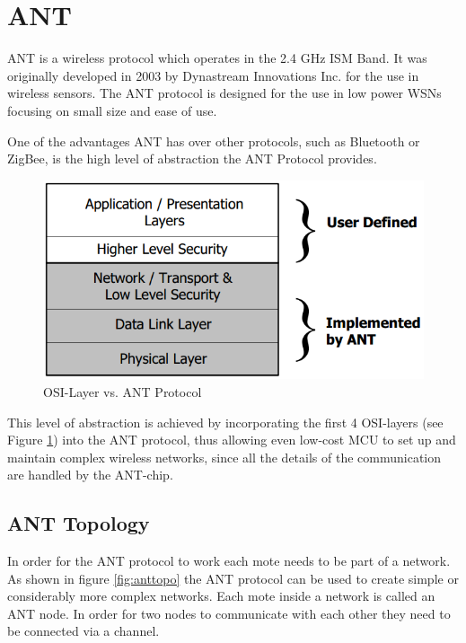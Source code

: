 \section{ANT}
ANT \cite{DynastreamInnovationsInc.2013} is a wireless protocol which operates in the 2.4 GHz ISM Band. It was originally developed in 2003 by Dynastream Innovations Inc. for the use in wireless sensors. The ANT protocol is designed for the use in low power WSNs focusing on small size and ease of use.

One of the advantages ANT has over other protocols, such as Bluetooth or ZigBee, is the high level of abstraction the ANT Protocol provides. 
\begin{figure}[H]
	\centering
	\includegraphics[scale=.5]{content/images/ANTstack.png}
	\caption{OSI-Layer vs. ANT Protocol\cite{Networks}}\label{fig:osilayer}
\end{figure}

This level of abstraction is achieved by incorporating the first 4 OSI-layers (see Figure \ref{fig:osilayer}) into the ANT protocol, thus allowing even low-cost MCU to set up and maintain complex wireless networks, since all the details of the communication are handled by the ANT-chip.

\subsection{ANT Topology}
In order for the ANT protocol to work each mote needs to be part of a network. As shown in figure \ref{fig:anttopo} the ANT protocol can be used to create simple or considerably more complex networks. Each mote inside a network is called an ANT node. In order for two nodes to communicate with each other they need to be connected via a channel.

